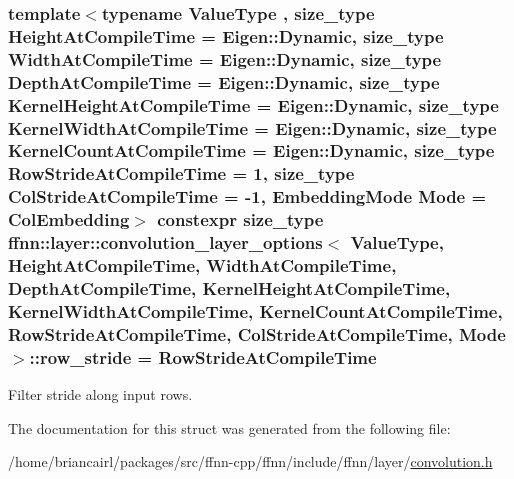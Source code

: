 \hypertarget{structffnn_1_1layer_1_1convolution__layer__options_a6a12ff75eaa8b67b66396b90804e8187}{
\subsubsection[{row\-\_\-stride}]{\setlength{\rightskip}{0pt plus 5cm}template$<$typename Value\-Type , size\-\_\-type Height\-At\-Compile\-Time = Eigen\-::\-Dynamic, size\-\_\-type Width\-At\-Compile\-Time = Eigen\-::\-Dynamic, size\-\_\-type Depth\-At\-Compile\-Time = Eigen\-::\-Dynamic, size\-\_\-type Kernel\-Height\-At\-Compile\-Time = Eigen\-::\-Dynamic, size\-\_\-type Kernel\-Width\-At\-Compile\-Time = Eigen\-::\-Dynamic, size\-\_\-type Kernel\-Count\-At\-Compile\-Time = Eigen\-::\-Dynamic, size\-\_\-type Row\-Stride\-At\-Compile\-Time = 1, size\-\_\-type Col\-Stride\-At\-Compile\-Time = -\/1, Embedding\-Mode Mode = Col\-Embedding$>$ constexpr {\bf size\-\_\-type} {\bf ffnn\-::layer\-::convolution\-\_\-layer\-\_\-options}$<$ Value\-Type, Height\-At\-Compile\-Time, Width\-At\-Compile\-Time, Depth\-At\-Compile\-Time, Kernel\-Height\-At\-Compile\-Time, Kernel\-Width\-At\-Compile\-Time, Kernel\-Count\-At\-Compile\-Time, Row\-Stride\-At\-Compile\-Time, Col\-Stride\-At\-Compile\-Time, Mode $>$\-::row\-\_\-stride = Row\-Stride\-At\-Compile\-Time\hspace{0.3cm}{\ttfamily [static]}}}\label{structffnn_1_1layer_1_1convolution__layer__options_a6a12ff75eaa8b67b66396b90804e8187}


Filter stride along input rows. 



The documentation for this struct was generated from the following file\-:\begin{DoxyCompactItemize}
\item 
/home/briancairl/packages/src/ffnn-\/cpp/ffnn/include/ffnn/layer/\hyperlink{convolution_8h}{convolution.\-h}\end{DoxyCompactItemize}
